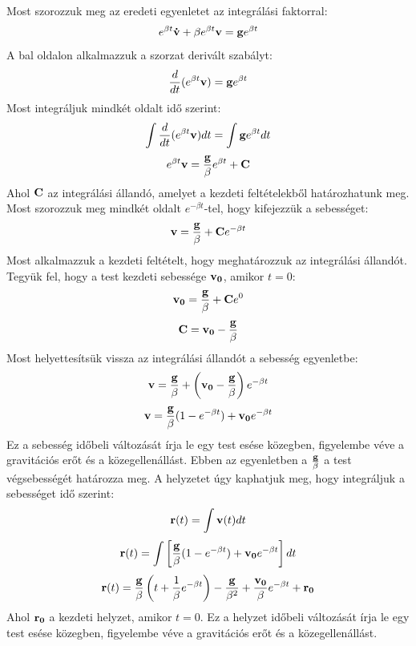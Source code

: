 \documentclass[../main.tex]{subfiles}
\begin{document}
Most szorozzuk meg az eredeti egyenletet az integrálási faktorral:
\begin{equation}
    e^{\beta t}\bold{\dot{v}} + \beta e^{\beta t}\bold{v} = \bold{g}e^{\beta t}
\end{equation}
A bal oldalon alkalmazzuk a szorzat derivált szabályt:
\begin{equation}
    \frac{d}{dt}(e^{\beta t}\bold{v}) = \bold{g}e^{\beta t}
\end{equation}
Most integráljuk mindkét oldalt idő szerint:
\begin{equation}
    \int \frac{d}{dt}(e^{\beta t}\bold{v}) dt = \int \bold{g}e^{\beta t} dt
\end{equation}
\begin{equation}
    e^{\beta t}\bold{v} = \frac{\bold{g}}{\beta}e^{\beta t} + \bold{C}
\end{equation}
Ahol $\bold{C}$ az integrálási állandó, amelyet a kezdeti feltételekből határozhatunk meg. Most szorozzuk meg mindkét oldalt $e^{-\beta t}$-tel, hogy kifejezzük a sebességet:
\begin{equation}
    \bold{v} = \frac{\bold{g}}{\beta} + \bold{C}e^{-\beta t}
\end{equation}
Most alkalmazzuk a kezdeti feltételt, hogy meghatározzuk az integrálási állandót. Tegyük fel, hogy a test kezdeti sebessége $\bold{v_0}$, amikor $t = 0$:
\begin{equation}
    \bold{v_0} = \frac{\bold{g}}{\beta} + \bold{C}e^{0}
\end{equation}
\begin{equation}
    \bold{C} = \bold{v_0} - \frac{\bold{g}}{\beta}
\end{equation}
Most helyettesítsük vissza az integrálási állandót a sebesség egyenletbe:
\begin{equation}
    \bold{v} = \frac{\bold{g}}{\beta} + \left(\bold{v_0} - \frac{\bold{g}}{\beta}\right)e^{-\beta t}
\end{equation}
\begin{equation}
    \bold{v} = \frac{\bold{g}}{\beta}(1 - e^{-\beta t}) + \bold{v_0}e^{-\beta t}
\end{equation}
Ez a sebesség időbeli változását írja le egy test esése közegben, figyelembe véve a gravitációs erőt és a közegellenállást. Ebben az egyenletben a $\frac{\bold{g}}{\beta}$ a test végsebességét határozza meg.
A helyzetet úgy kaphatjuk meg, hogy integráljuk a sebességet idő szerint:
\begin{equation}
    \bold{r}(t) = \int \bold{v}(t) dt
\end{equation}
\begin{equation}
    \bold{r}(t) = \int \left[\frac{\bold{g}}{\beta}(1 - e^{-\beta t}) + \bold{v_0}e^{-\beta t}\right] dt
\end{equation}
\begin{equation}
    \bold{r}(t) = \frac{\bold{g}}{\beta}\left(t + \frac{1}{\beta}e^{-\beta t}\right) - \frac{\bold{g}}{\beta^2} + \frac{\bold{v_0}}{\beta}e^{-\beta t} + \bold{r_0} 
\end{equation}
Ahol $\bold{r_0}$ a kezdeti helyzet, amikor $t = 0$. Ez a helyzet időbeli változását írja le egy test esése közegben, figyelembe véve a gravitációs erőt és a közegellenállást.
\end{document}
